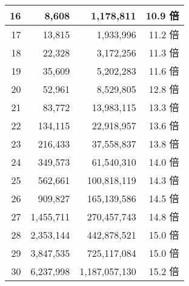 \begin{table}[htbp]
\begin{center}
\begin{tabular}{rrrr}
      16 &     8,608 &     1,178,811 & 10.9 倍 \\ \hline
      17 &    13,815 &     1,933,996 & 11.2 倍 \\ \hline
      18 &    22,328 &     3,172,256 & 11.3 倍 \\ \hline
      19 &    35,609 &     5,202,283 & 11.6 倍 \\ \hline
      20 &    52,961 &     8,529,805 & 12.8 倍 \\ \hline
      21 &    83,772 &    13,983,115 & 13.3 倍 \\ \hline
      22 &   134,115 &    22,918,957 & 13.6 倍 \\ \hline
      23 &   216,433 &    37,558,837 & 13.8 倍 \\ \hline
      24 &   349,573 &    61,540,310 & 14.0 倍 \\ \hline
      25 &   562,661 &   100,818,119 & 14.3 倍 \\ \hline
      26 &   909,827 &   165,139,586 & 14.5 倍 \\ \hline
      27 & 1,455,711 &   270,457,743 & 14.8 倍 \\ \hline
      28 & 2,353,144 &   442,878,521 & 15.0 倍 \\ \hline
      29 & 3,847,535 &   725,117,084 & 15.0 倍 \\ \hline
      30 & 6,237,998 & 1,187,057,130 & 15.2 倍 \\ \hline
    \end{tabular}
  \end{center}
\end{table}

